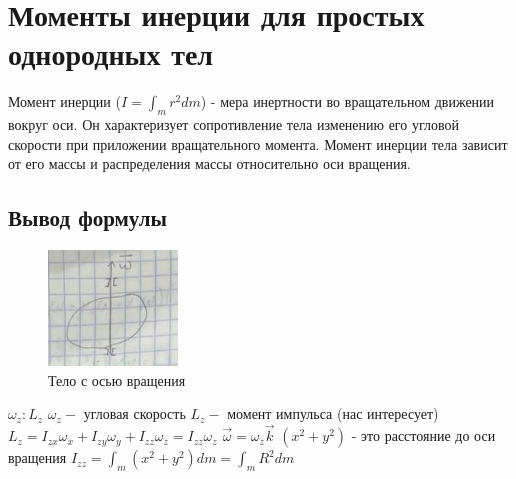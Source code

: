 \documentclass[a4paper]{article}
\begin{document}
	
	\section{Моменты инерции для простых однородных тел} 
	\begin{flushleft}
	Момент инерции ($I = \int_m r^2 dm$) - мера инертности во вращательном движении вокруг оси. Он характеризует сопротивление тела изменению его угловой скорости при приложении вращательного момента. \linebreak
	Момент инерции тела зависит от его массы и распределения массы относительно оси вращения.  \linebreak
\end{flushleft}
\subsection*{Вывод формулы}
\begin{flushleft}
	\begin{figure}[h]
		
		\centering
		
		\includegraphics[width=0.8\linewidth]{images/22_1.png}
		
		\caption{Тело с осью вращения}
		
		\label{fig:mpr}
		
	\end{figure}
	$\omega_z : L_z$ \linebreak
	$\omega_z -$ угловая скорость\linebreak
	$L_z -$ момент импульса (нас интересует) \linebreak
	$L_z = I_{zx} \omega_x + I_{zy} \omega_y + I_{zz} \omega_z =  I_{zz} \omega_z$ \linebreak
	$ \vec{\omega} = \omega_z  \vec{k}$ \linebreak
	$(x^2 + y^2)$ - это расстояние до оси вращения \linebreak
	$I_{zz} = \int_m (x^2 + y ^ 2)dm = \int_m R^2 dm$
\end{flushleft}
\end{document}
